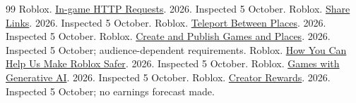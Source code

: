 \begin{thebibliography}{99}
 Roblox. \href{https://create.roblox.com/docs/cloud-services/http-service}{In-game HTTP Requests}. 2026. Inspected 5 October.
 Roblox. \href{https://create.roblox.com/docs/production/promotion/share-links}{Share Links}. 2026. Inspected 5 October.
 Roblox. \href{https://create.roblox.com/docs/projects/teleport}{Teleport Between Places}. 2026. Inspected 5 October.
 Roblox. \href{https://create.roblox.com/docs/production/publishing/publish-games-and-places}{Create and Publish Games and Places}. 2026. Inspected 5 October; audience-dependent requirements.
 Roblox. \href{https://create.roblox.com/docs/safety}{How You Can Help Us Make Roblox Safer}. 2026. Inspected 5 October.
 Roblox. \href{https://create.roblox.com/docs/generative-AI}{Games with Generative AI}. 2026. Inspected 5 October.
 Roblox. \href{https://create.roblox.com/docs/creator-rewards}{Creator Rewards}. 2026. Inspected 5 October; no earnings forecast made.
\end{thebibliography}
